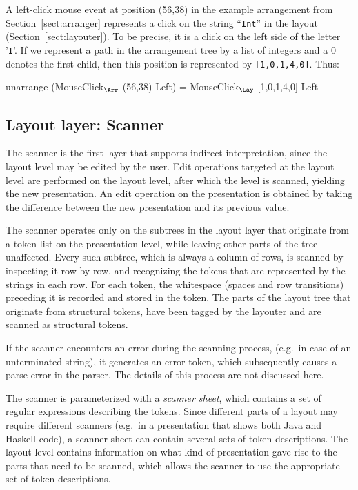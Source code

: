 A left-click mouse event at position (56,38) in the example arrangement from Section~\ref{sect:arranger} represents a click on the string ``\verb|Int|'' in the layout (Section~\ref{sect:layouter}). To be precise, it is a click on the left side of the letter '\verb|I|'. If we represent a path in the arrangement tree by a list of integers and a 0 denotes the first child, then this position is represented by \verb|[1,0,1,4,0]|. Thus:

\small \ttfamily
unarrange (MouseClick$_{\Arr}$ (56,38) Left) = MouseClick$_{\Lay}$ [1,0,1,4,0] Left
\rmfamily \normalsize


%																
\subsection{Layout layer: Scanner} \label{sect:scanner}

The scanner is the first layer that supports indirect interpretation, since the layout level may be edited by the user. Edit operations targeted at the layout level are performed on the layout level, after which the level is scanned, yielding the new presentation. An edit operation on the presentation is obtained by taking the difference between the new presentation and its previous value. 

The scanner operates only on the subtrees in the layout layer that originate from a token list on the presentation level, while leaving other parts of the tree unaffected. Every such subtree, which is always a column of rows, is scanned by inspecting it row by row, and recognizing the tokens that are represented by the strings in each row. For each token, the whitespace (spaces and row transitions) preceding it is recorded and stored in the token. The parts of the layout tree that originate from structural tokens, have been tagged by the layouter and are scanned as structural tokens.

If the scanner encounters an error during the scanning process, (e.g.\ in case of an unterminated string), it generates an error token, which subsequently causes a parse error in the parser. The details of this process are not discussed here. 

The scanner is parameterized with a {\em scanner sheet}, which contains a set of regular expressions describing the tokens. Since different parts of a layout may require different scanners (e.g.\ in a presentation that shows both Java and Haskell code), a scanner sheet can contain several sets of token descriptions. The layout level contains information on what kind of presentation gave rise to the parts that need to be scanned, which allows the scanner to use the appropriate set of token descriptions.

